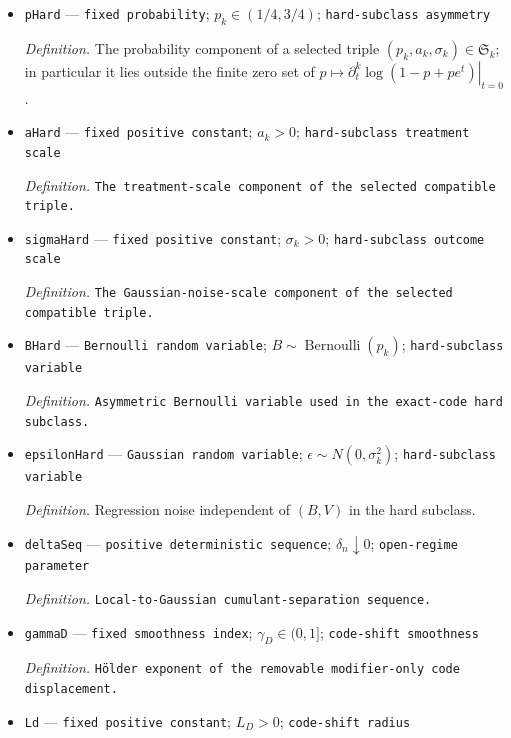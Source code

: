 \documentclass{article}
\begin{document}
\begin{itemize}
  \item \texttt{pHard} --- \texttt{fixed probability}; \(p_k\in(1/4,3/4)\); \texttt{hard-\allowbreak{}subclass asymmetry}
  \par\smallskip\noindent\emph{Definition.} The probability component of a selected triple \((p_k,a_k,\sigma_k)\in\mathfrak S_k\); in particular it lies outside the finite zero set of \(p\mapsto\left.\partial_t^k\log(1-p+pe^t)\right|_{t=0}\).
  \item \texttt{aHard} --- \texttt{fixed positive constant}; \(a_k>0\); \texttt{hard-\allowbreak{}subclass treatment scale}
  \par\smallskip\noindent\emph{Definition.} \texttt{The treatment-\allowbreak{}scale component of the selected compatible triple.}
  \item \texttt{sigmaHard} --- \texttt{fixed positive constant}; \(\sigma_k>0\); \texttt{hard-\allowbreak{}subclass outcome scale}
  \par\smallskip\noindent\emph{Definition.} \texttt{The Gaussian-\allowbreak{}noise-\allowbreak{}scale component of the selected compatible triple.}
  \item \texttt{BHard} --- \texttt{Bernoulli random variable}; \(B\sim\operatorname{Bernoulli}(p_k)\); \texttt{hard-\allowbreak{}subclass variable}
  \par\smallskip\noindent\emph{Definition.} \texttt{Asymmetric Bernoulli variable used in the exact-\allowbreak{}code hard subclass.}
  \item \texttt{epsilonHard} --- \texttt{Gaussian random variable}; \(\epsilon\sim N(0,\sigma_k^2)\); \texttt{hard-\allowbreak{}subclass variable}
  \par\smallskip\noindent\emph{Definition.} Regression noise independent of \((B,V)\) in the hard subclass.
  \item \texttt{deltaSeq} --- \texttt{positive deterministic sequence}; \(\delta_n\downarrow0\); \texttt{open-\allowbreak{}regime parameter}
  \par\smallskip\noindent\emph{Definition.} \texttt{Local-\allowbreak{}to-\allowbreak{}Gaussian cumulant-\allowbreak{}separation sequence.}
  \item \texttt{gammaD} --- \texttt{fixed smoothness index}; \(\gamma_D\in(0,1]\); \texttt{code-\allowbreak{}shift smoothness}
  \par\smallskip\noindent\emph{Definition.} \texttt{Hölder exponent of the removable modifier-\allowbreak{}only code displacement.}
  \item \texttt{Ld} --- \texttt{fixed positive constant}; \(L_D>0\); \texttt{code-\allowbreak{}shift radius}

\end{itemize}
\end{document}
